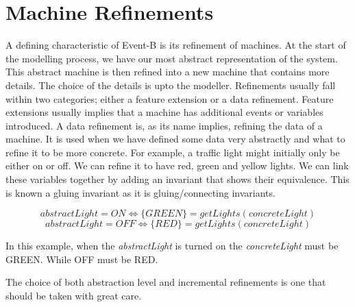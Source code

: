 \section{Machine Refinements}
A defining characteristic of Event-B is its refinement of machines. At the start of the modelling process, we have our most abstract representation of the system. This abstract machine is then refined into a new machine that contains more details. The choice of the details is upto the modeller. Refinements usually fall within two categories; either a feature extension or a data refinement. Feature extensions usually implies that a machine has additional events or variables introduced. A data refinement is, as its name implies, refining the data of a machine. It is used when we have defined some data very abstractly and what to refine it to be more concrete. For example, a traffic light might initially only be either on or off. We can refine it to have red, green and yellow lights. We can link these variables together by adding an invariant that shows their equivalence. This is known a gluing invariant as it is gluing/connecting invariants.

$$ abstractLight = ON  \Leftrightarrow \{GREEN\} = getLights(concreteLight)$$
$$ abstractLight = OFF \Leftrightarrow \{RED\}   = getLights(concreteLight)$$ 

In this example, when the \textit{abstractLight} is turned on the \textit{concreteLight} must be GREEN. While OFF must be {RED}.


The choice of both abstraction level and incremental refinements is one that should be taken with great care.
